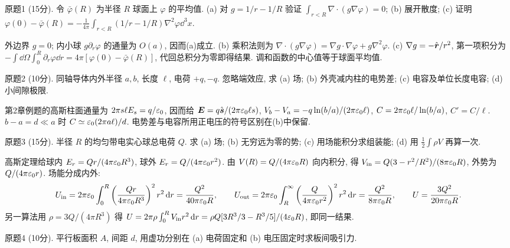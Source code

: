 \begin{exercise}
原题1 (15分). 令 $\bar\varphi(R)$ 为半径 $R$ 球面上 $\varphi$ 的平均值. (a) 对 $g=1/r-1/R$ 验证 $\int_{r<R}\nabla\cdot(g\nabla\varphi)=0$; (b) 展开散度; (c) 证明
$\varphi(0)-\bar\varphi(R)=-\frac1{4\pi}\int_{r<R}(1/r-1/R)\nabla^2\varphi\dd^3x$.
\end{exercise}
\begin{solution}
外边界 $g=0$; 内小球 $g\partial_r\varphi$ 的通量为 $O(a)$, 因而(a)成立. (b) 乘积法则为 $\nabla\cdot(g\nabla\varphi)=\nabla g\cdot\nabla\varphi+g\nabla^2\varphi$. (c) $\nabla g=-\hat{\boldsymbol{r}}/r^2$, 第一项积分为 $-\int\dd\Omega\int_0^R\partial_r\varphi\dd r=4\pi[\varphi(0)-\bar\varphi(R)]$, 代回总积分为零即得结果. 调和函数的中心值等于球面平均值.
\end{solution}
\begin{exercise}
原题2 (10分). 同轴导体内外半径 $a,b$, 长度 $\ell$, 电荷 $+q,-q$. 忽略端效应, 求 (a) 场; (b) 外壳减内柱的电势差; (c) 电容及单位长度电容; (d) 小间隙极限.
\end{exercise}
\begin{solution}
第2章例题的高斯柱面通量为 $2\pi s\ell E_s=q/\varepsilon_0$, 因而给 $\boldsymbol{E}=q\hat{\boldsymbol{s}}/(2\pi\varepsilon_0\ell s)$, $V_b-V_a=-q\ln(b/a)/(2\pi\varepsilon_0\ell)$, $C=2\pi\varepsilon_0\ell/\ln(b/a)$, $C'=C/\ell$. $b-a=d\ll a$ 时 $C\simeq\varepsilon_0(2\pi a\ell)/d$. 电势差与电容所用正电压的符号区别在(b)中保留.
\end{solution}
\begin{exercise}
原题3 (15分). 半径 $R$ 的均匀带电实心球总电荷 $Q$. 求 (a) 场; (b) 无穷远为零的势; (c) 用场能积分求组装能; (d) 用 $\frac12\int\rho V$ 再算一次.
\end{exercise}
\begin{solution}
高斯定理给球内 $E_r=Qr/(4\pi\varepsilon_0 R^3)$, 球外 $E_r=Q/(4\pi\varepsilon_0 r^2)$. 由 $V(R)=Q/(4\pi\varepsilon_0 R)$ 向内积分, 得 $V_\mathrm{in}=Q(3-r^2/R^2)/(8\pi\varepsilon_0 R)$, 外势为 $Q/(4\pi\varepsilon_0 r)$. 场能分成内外:
\[
U_\mathrm{in}=2\pi\varepsilon_0\int_0^R\left(\frac{Qr}{4\pi\varepsilon_0 R^3}\right)^2r^2\,\mathrm d r=\frac{Q^2}{40\pi\varepsilon_0 R},\qquad
U_\mathrm{out}=2\pi\varepsilon_0\int_R^\infty\left(\frac Q{4\pi\varepsilon_0 r^2}\right)^2r^2\,\mathrm d r=\frac{Q^2}{8\pi\varepsilon_0 R},\qquad U=\frac{3Q^2}{20\pi\varepsilon_0 R}.
\]
另一算法用 $\rho=3Q/(4\pi R^3)$ 得
$U=2\pi\rho\int_0^R V_\mathrm{in}r^2\,\mathrm d r=\rho Q[3R^3/3-R^3/5]/(4\varepsilon_0 R)$, 即同一结果.
\end{solution}
\begin{exercise}
原题4 (10分). 平行板面积 $A$, 间距 $d$, 用虚功分别在 (a) 电荷固定和 (b) 电压固定时求板间吸引力.
\end{exercise}
